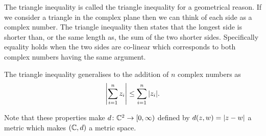 \documentclass{article}
\begin{document}
    The triangle inequality is called the triangle inequality for a geometrical reason.
    If we consider a triangle in the complex plane then we can think of each side as a complex number.
    The triangle inequality then states that the longest side is shorter than, or the same length as, the sum of the two shorter sides.
    Specifically equality holds when the two sides are co-linear which corresponds to both complex numbers having the same argument.
    
    The triangle inequality generalises to the addition of \(n\) complex numbers as
    \[\abs{\sum_{i=1}^{n} z_i} \le \sum_{i=1}^{n} \abs{z_i}.\]
    
    Note that these properties make \(d\colon\mathbb{C}^2 \to [0, \infty)\) defined by \(d(z, w) = \abs{z - w}\) a metric which makes \((\mathbb{C}, d)\) a metric space.
    
\end{document}
